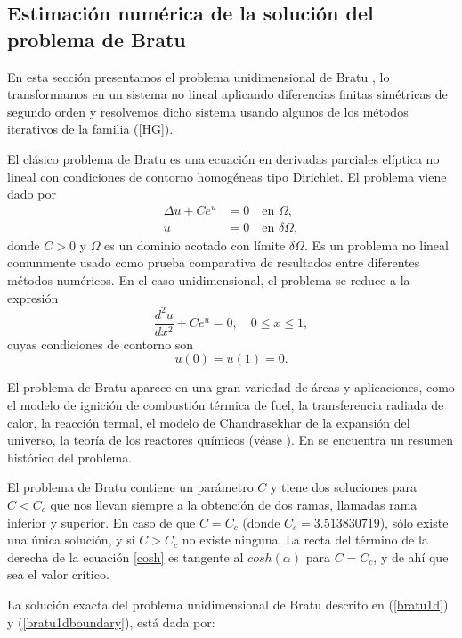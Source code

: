 \subsection{Estimación numérica de la solución del problema de Bratu}\label{numericabratu}
En esta sección presentamos el problema unidimensional de Bratu \cite{bratu}, lo transformamos en un sistema no lineal aplicando diferencias finitas simétricas de segundo orden y resolvemos dicho sistema usando algunos de los métodos iterativos de la familia (\ref{HG}).

El clásico problema de Bratu es una ecuación en derivadas parciales elíptica no lineal con condiciones de contorno homogéneas tipo Dirichlet. El problema viene dado por
\begin{align} \label{bratu}
\Delta u+Ce^u&=0 \quad \text{en } \Omega, \\ \nonumber
u&=0 \quad \text{en } \delta \Omega,
\end{align}
donde $C >0$ y $\Omega$ es un dominio acotado con límite $\delta \Omega$. Es un problema no lineal comunmente usado como prueba comparativa de resultados entre diferentes métodos numéricos. En el caso unidimensional, el problema se reduce a la expresión
\begin{equation} \label{bratu1d}
\dfrac{d^2u}{dx^2}+Ce^u=0, \quad 0 \leq x \leq 1,
\end{equation}
cuyas condiciones de contorno son
\begin{equation} \label{bratu1dboundary}
u(0)=u(1)=0.
\end{equation}

El problema de Bratu aparece en una gran variedad de áreas y aplicaciones, como el modelo de ignición de combustión térmica de fuel, la transferencia radiada de calor, la reacción termal, el modelo de Chandrasekhar de la expansión del universo, la teoría de los reactores químicos (véase \cite{bratu2,bratu4,bratu5,bratu3}). En \cite{bratu4} se encuentra un resumen histórico del problema.

El problema de Bratu contiene un parámetro $C$ y tiene dos soluciones para $C < C_c$ que nos llevan siempre a la obtención de dos ramas, llamadas rama inferior y superior. En caso de que $C=C_c$ (donde $C_c=3.513830719$), sólo existe una única solución, y si $C>C_c$ no existe ninguna. La recta del término de la derecha de la ecuación \eqref{cosh} es tangente al $cosh(\alpha)$ para $C=C_c$, y de ahí que sea el valor crítico.

La solución exacta del problema unidimensional de Bratu descrito en (\ref{bratu1d}) y (\ref{bratu1dboundary}), está dada por:


